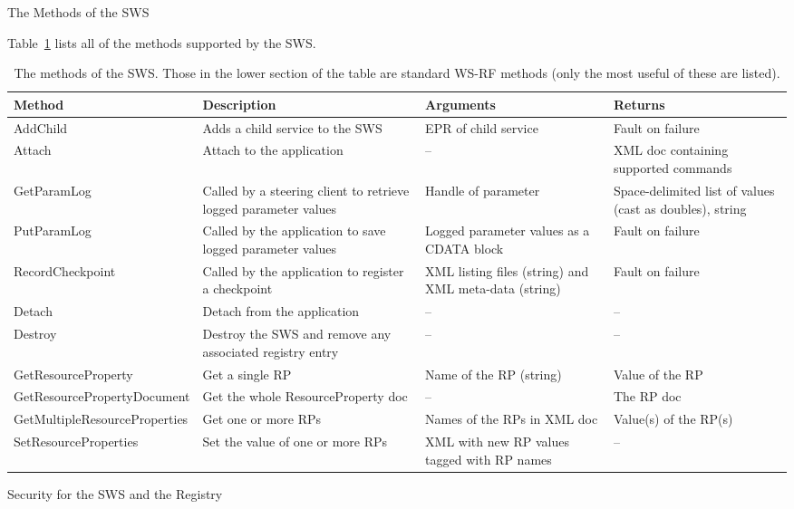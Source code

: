 \documentclass[a4paper]{article}
\begin{document}
\begin{section}{The Methods of the SWS}

Table~\ref{table:SWSmethods} lists all of the methods supported by the
SWS.

\begin{table}
\begin{center}
\begin{tabular}{l|p{4cm}|p{4cm}|p{3cm}}
\hline\hline
Method & Description & Arguments & Returns\\
\hline
AddChild & Adds a child service to the SWS 
& EPR of child service  
& Fault on failure \\

Attach & Attach to the application & -- 
& XML doc containing supported commands\\

GetParamLog & Called by a steering client to retrieve logged parameter values 
& Handle of parameter 
& Space-delimited list of values (cast as doubles), string \\

PutParamLog & Called by the application to save logged parameter values 
& Logged parameter values as a CDATA block
& Fault on failure \\

RecordCheckpoint & Called by the application to register a checkpoint 
& XML listing files (string) and XML meta-data (string)
& Fault on failure \\

Detach & Detach from the application & -- & --\\
\hline
Destroy & Destroy the SWS and remove any associated registry entry & -- &--\\
GetResourceProperty & Get a single RP & Name of the RP (string) 
& Value of the RP \\

GetResourcePropertyDocument & Get the whole ResourceProperty doc 
& -- & The RP doc\\

GetMultipleResourceProperties & Get one or more RPs 
& Names of the RPs in XML doc & Value(s) of the RP(s) \\
SetResourceProperties & Set the value of one or more RPs 
& XML with new RP values tagged with RP names & -- \\
\hline\hline
\end{tabular}
\end{center}
\caption{The methods of the SWS.  Those in the lower section of the table 
are standard WS-RF methods (only the most useful of these are listed).}
\label{table:SWSmethods}
\end{table}

\end{section}

\begin{section}{Security for the SWS and the Registry}
\label{sec:security}
\end{section}
\end{document}
